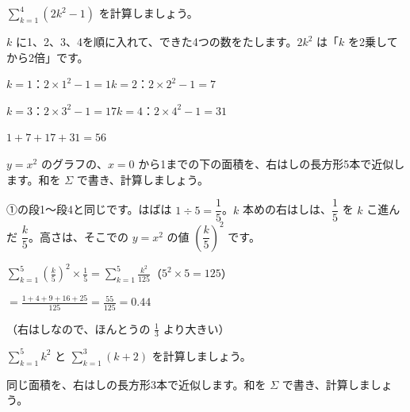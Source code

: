 \begin{kotoba}
\small
{}
\end{kotoba}


\begin{reidai}
$\displaystyle\sum_{k=1}^{4}(2k^2-1)$ を計算しましょう。\par
\kangaekata $k$ に1、2、3、4を順に入れて、できた4つの数をたします。$2k^2$ は「$k$ を2乗してから2倍」です。\par
\shiki $k=1$：$2\times1^2-1=1$\qquad $k=2$：$2\times2^2-1=7$\par
\hspace*{2.6\zw}$k=3$：$2\times3^2-1=17$\qquad $k=4$：$2\times4^2-1=31$\par
\hspace*{2.6\zw}$1+7+17+31=56$\par
{}
\end{reidai}

\begin{reidai}
$y=x^2$ のグラフの、$x=0$ から1までの下の面積を、右はしの長方形5本で近似します。和を $\Sigma$ で書き、計算しましょう。\par
\kangaekata ①の段1〜段4と同じです。はばは $1\div5=\dfrac{1}{5}$。$k$ 本めの右はしは、$\dfrac{1}{5}$ を $k$ こ進んだ $\dfrac{k}{5}$。高さは、そこでの $y=x^2$ の値 $\left(\dfrac{k}{5}\right)^2$ です。\par
\shiki $\displaystyle\sum_{k=1}^{5}\left(\frac{k}{5}\right)^2\times\frac{1}{5}=\sum_{k=1}^{5}\frac{k^2}{125}$\quad（$5^2\times5=125$）\par
\hspace*{2.6\zw}$\displaystyle=\frac{1+4+9+16+25}{125}=\frac{55}{125}=0.44$\par
{}（右はしなので、ほんとうの $\frac{1}{3}$ より大きい）
\end{reidai}

\noindent\begin{minipage}[t]{0.485\linewidth}\vspace{0pt}\raggedright
\begin{jibun}
$\displaystyle\sum_{k=1}^{5}k^2$ と $\displaystyle\sum_{k=1}^{3}(k+2)$ を計算しましょう。
\end{jibun}
\end{minipage}\hfill
\begin{minipage}[t]{0.485\linewidth}\vspace{0pt}\raggedright
\begin{jibun}
同じ面積を、右はしの長方形3本で近似します。和を $\Sigma$ で書き、計算しましょう。
\end{jibun}
\end{minipage}

